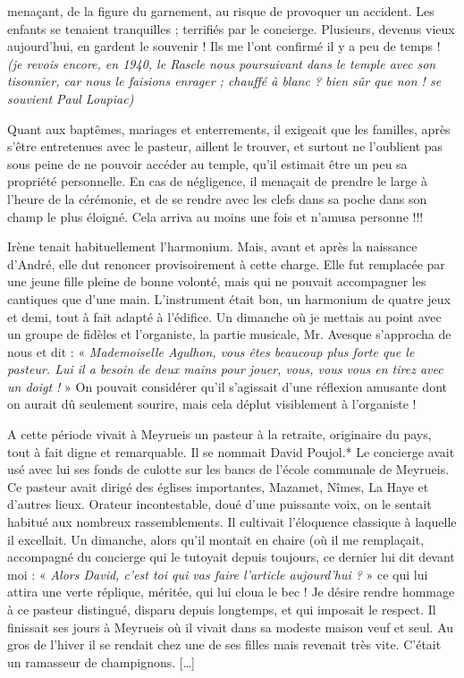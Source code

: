 
menaçant, de la figure du garnement, au risque de provoquer un accident. Les enfants
se tenaient tranquilles ; terrifiés par le concierge. Plusieurs, devenus vieux
aujourd’hui, en gardent le souvenir ! Ils me l’ont confirmé il y a peu de temps !
\emph{(je revois encore, en 1940, le Rascle nous poursuivant dans le temple avec son tisonnier, car nous le
faisions enrager ; chauffé à blanc ? bien sûr que non ! se souvient Paul Loupiac)}

Quant aux baptêmes, mariages et enterrements, il exigeait que les familles, après
s’être entretenues avec le pasteur, aillent le trouver, et surtout ne l’oublient pas sous
peine de ne pouvoir accéder au temple, qu’il estimait être un peu sa propriété
personnelle. En cas de négligence, il menaçait de prendre le large à l’heure de la
cérémonie, et de se rendre avec les clefs dans sa poche dans son champ le plus
éloigné. Cela arriva au moins une fois et n’amusa personne !!!

Irène tenait habituellement l’harmonium. Mais, avant et après la naissance d’André,
elle dut renoncer provisoirement à cette charge. Elle fut remplacée par une jeune fille
pleine de bonne volonté, mais qui ne pouvait accompagner les cantiques que d’une
main. L’instrument était bon, un harmonium de quatre jeux et demi, tout à fait adapté
à l’édifice. Un dimanche où je mettais au point avec un groupe de fidèles et
l’organiste, la partie musicale, Mr. Avesque s’approcha de nous et dit :
« \emph{Mademoiselle Agulhon, vous êtes beaucoup plus forte que le pasteur. Lui il a
besoin de deux mains pour jouer, vous, vous vous en tirez avec un doigt !} » On
pouvait considérer qu’il s’agissait d’une réflexion amusante dont on aurait dû
seulement sourire, mais cela déplut visiblement à l’organiste !

A cette période vivait à Meyrueis un pasteur à la retraite, originaire du pays, tout à
fait digne et remarquable. Il se nommait David Poujol.* Le concierge avait usé avec
lui ses fonds de culotte sur les bancs de l'école communale de Meyrueis. Ce pasteur
avait dirigé des églises importantes, Mazamet, Nîmes, La Haye et d’autres lieux.
Orateur incontestable, doué d’une puissante voix, on le sentait habitué aux nombreux
rassemblements. Il cultivait l’éloquence classique à laquelle il excellait. Un
dimanche, alors qu’il montait en chaire (où il me remplaçait, accompagné du
concierge qui le tutoyait depuis toujours, ce dernier lui dit devant moi : « \emph{Alors
David, c’est toi qui vas faire l’article aujourd’hui ?} » ce qui lui attira une verte
réplique, méritée, qui lui cloua le bec !
Je désire rendre hommage à ce pasteur distingué, disparu depuis longtemps, et qui
imposait le respect. Il finissait ses jours à Meyrueis où il vivait dans sa modeste
maison veuf et seul. Au gros de l’hiver il se rendait chez une de ses filles mais
revenait très vite. C’était un ramasseur de champignons. [\ldots]

